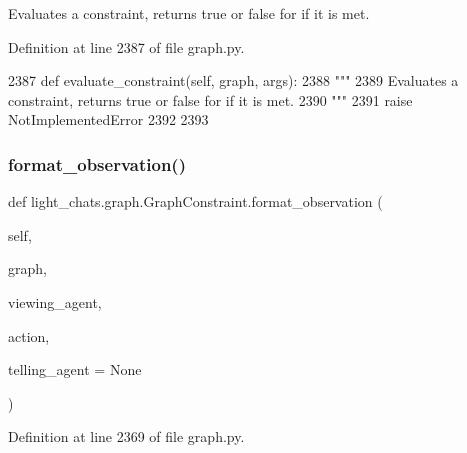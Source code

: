 \begin{DoxyVerb}Evaluates a constraint, returns true or false for if it is met.
\end{DoxyVerb}
 

Definition at line 2387 of file graph.\+py.


\begin{DoxyCode}
2387     \textcolor{keyword}{def }evaluate\_constraint(self, graph, args):
2388         \textcolor{stringliteral}{"""}
2389 \textcolor{stringliteral}{        Evaluates a constraint, returns true or false for if it is met.}
2390 \textcolor{stringliteral}{        """}
2391         \textcolor{keywordflow}{raise} NotImplementedError
2392 
2393 
\end{DoxyCode}
\mbox{\label{classlight__chats_1_1graph_1_1GraphConstraint_aa2918a7125065dcd76dd0ee09650fd38}} 
\subsubsection{\texorpdfstring{format\+\_\+observation()}{format\_observation()}}
{\footnotesize\ttfamily def light\+\_\+chats.\+graph.\+Graph\+Constraint.\+format\+\_\+observation (\begin{DoxyParamCaption}\item[{}]{self,  }\item[{}]{graph,  }\item[{}]{viewing\+\_\+agent,  }\item[{}]{action,  }\item[{}]{telling\+\_\+agent = {\ttfamily None} }\end{DoxyParamCaption})}



Definition at line 2369 of file graph.\+py.


